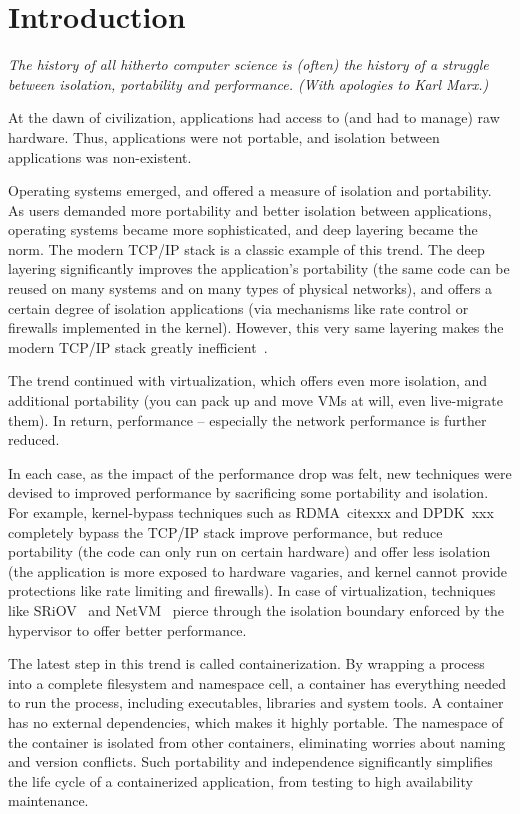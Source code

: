 \section{Introduction} 
\label{sec:introduction}

{\em 
The history of all hitherto computer science is (often) the history of a
struggle between isolation, portability and performance. (With apologies to Karl
Marx.)}

At the dawn of civilization, applications had access to (and had to manage) raw
hardware. Thus, applications were not portable, and isolation between
applications was non-existent.

Operating systems emerged, and offered a measure of isolation and portability.
As users demanded more portability and better isolation between applications,
operating systems became more sophisticated, and deep layering became the norm.
The modern TCP/IP stack is a classic example of this trend. The deep layering
significantly improves the application's portability (the same code can be reused
on many systems and on many types of physical networks), and offers a certain
degree of isolation applications (via mechanisms like rate control or firewalls
implemented in the kernel). 
However, this very same layering makes the modern TCP/IP stack greatly
inefficient~\cite{dcqcn,luigipapers}. 

The trend continued with virtualization, which offers even more isolation, and
additional portability (you can pack up and move VMs at will, even live-migrate
them). In return, performance -- especially the network performance is further
reduced.

In each case, as the impact of the performance drop was felt, new techniques
were devised to improved performance by sacrificing some portability and
isolation.  For example, kernel-bypass techniques such as RDMA~cite{xxx} and
DPDK~{xxx} completely bypass the TCP/IP stack improve performance, but reduce
portability (the code can only run on certain hardware) and offer less isolation
(the application is more exposed to hardware vagaries, and kernel cannot provide
protections like rate limiting and firewalls). In case of virtualization,
techniques like SRiOV~\cite{xxx} and NetVM~\cite{netvm} pierce through the
isolation boundary enforced by the hypervisor to offer better performance. 

The latest step in this trend is called containerization.  By wrapping a process
into a complete filesystem and namespace cell, a container has everything needed
to run the process, including executables, libraries and system tools.  A
container has no external dependencies, which makes it highly portable. The
namespace of the container is isolated from other containers, eliminating
worries about naming and version conflicts.  Such portability and independence
significantly simplifies the life cycle of a containerized application, from
testing to high availability maintenance.

